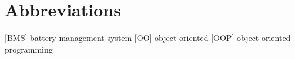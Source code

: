\section*{Abbreviations}
\thispagestyle{plain}
\begin{acronym}
	[BMS] battery management system
	[OO] object oriented
	[OOP] object oriented programming
	
\end{acronym}
